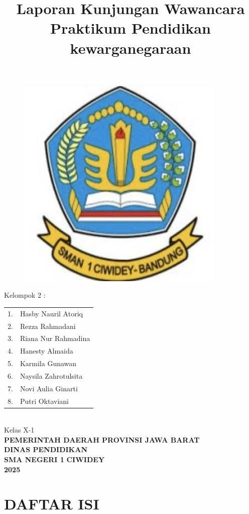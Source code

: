 \documentclass[a4paper,12pt, left=3cm,right=2cm,bottom=2cm, bahasa]{article}
\date{}
\title{Laporan Kunjungan Wawancara\\ Praktikum Pendidikan kewarganegaraan}
\begin{document}
\maketitle
\thispagestyle{empty}
\begin{figure}[H]
    \centering
    \includegraphics[width=0.3\linewidth]{images/sman1.png}
\end{figure}

\begin{center}
    Kelompok 2 : \\
    \begin{tabular}{ll}
         1.& Hasby Nauril Atoriq  \\
         2.& Rezza Rahmadani \\
         3.& Riana Nur Rahmadina \\
         4.& Hanesty Almaida \\
         5.& Karmila Gunawan \\
         6.& Naysila Zahrotulsita \\
         7.& Novi Aulia Ginarti \\
         8.& Putri Oktaviani \\

    \end{tabular}\\
    \vspace{0.5cm}
    Kelas X-1\\
    \vspace{1cm}
    \textbf{PEMERINTAH DAERAH PROVINSI JAWA BARAT}\\
    \textbf{DINAS PENDIDIKAN}\\
    \textbf{SMA NEGERI 1}
    \textbf{CIWIDEY}\\
    \textbf{2025}
\end{center}
\onehalfspacing{}
\setcounter{section}{1}
\pagebreak

    \section*{DAFTAR ISI}
\renewcommand{\cftdot}{.}
\renewcommand{\contentsname}{}
\tableofcontents
\end{document}
